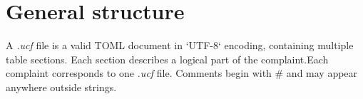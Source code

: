 
\section{General structure}

A \textit{.ucf} file is a valid TOML document in `UTF-8` encoding, containing
multiple table sections. Each section describes a logical part of the
complaint.Each complaint corresponds to one \textit{.ucf} file. Comments begin
with \# and may appear anywhere outside strings.

